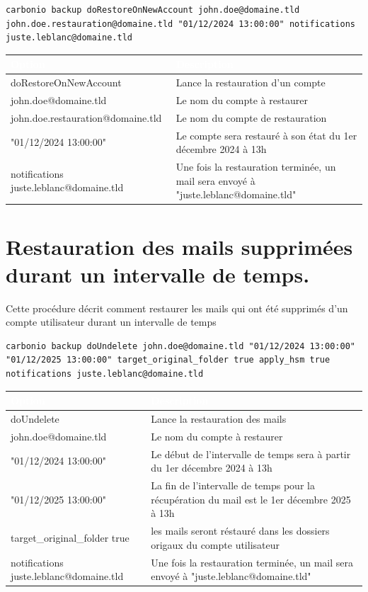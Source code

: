 \documentclass[11pt,a4paper]{report}
\newcommand{\tblhead}[1]{\textcolor{white}{\textbf{#1}}}
\begin{document}
\begin{lstlisting}
carbonio backup doRestoreOnNewAccount john.doe@domaine.tld john.doe.restauration@domaine.tld "01/12/2024 13:00:00" notifications juste.leblanc@domaine.tld
\end{lstlisting}
\begin{longtable}{|p{5.5cm}|p{7.5cm}|}
\hline
\rowcolor{primary}\tblhead{Option} & \tblhead{Description} \\
\hline
\endhead
doRestoreOnNewAccount & Lance la restauration d'un compte \\
\hline
john.\allowbreak{}doe@domaine.\allowbreak{}tld & Le nom du compte à restaurer \\
\hline
john.\allowbreak{}doe.\allowbreak{}restauration@domaine.\allowbreak{}tld & Le nom du compte de restauration \\
\hline
"01/12/2024 13:00:00" & Le compte sera restauré à son état du 1er décembre 2024 à 13h \\
\hline
notifications juste.\allowbreak{}leblanc@domaine.\allowbreak{}tld & Une fois la restauration terminée, un mail sera envoyé à "juste.\allowbreak{}leblanc@domaine.\allowbreak{}tld" \\
\hline
\end{longtable}



\section{Restauration des mails supprimées durant un intervalle de temps.\allowbreak{}}
Cette procédure décrit comment restaurer les mails qui ont été supprimés d'un compte utilisateur durant un intervalle de temps

\begin{lstlisting}
carbonio backup doUndelete john.doe@domaine.tld "01/12/2024 13:00:00" "01/12/2025 13:00:00" target_original_folder true apply_hsm true notifications juste.leblanc@domaine.tld
\end{lstlisting}
\begin{longtable}{|p{5.5cm}|p{7.5cm}|}
\hline
\rowcolor{primary}\tblhead{Option} & \tblhead{Description} \\
\hline
\endhead
doUndelete & Lance la restauration des mails \\
\hline
john.\allowbreak{}doe@domaine.\allowbreak{}tld & Le nom du compte à restaurer \\
\hline
"01/12/2024 13:00:00" & Le début de l'intervalle de temps sera à partir du 1er décembre 2024 à 13h \\
\hline
"01/12/2025 13:00:00" & La fin de l'intervalle de temps pour la récupération du mail est le 1er décembre 2025 à 13h \\
\hline
target\_original\_folder true & les mails seront réstauré dans les dossiers origaux du compte utilisateur \\
\hline
notifications juste.\allowbreak{}leblanc@domaine.\allowbreak{}tld & Une fois la restauration terminée, un mail sera envoyé à "juste.\allowbreak{}leblanc@domaine.\allowbreak{}tld" \\
\hline
\end{longtable}
\end{document}
